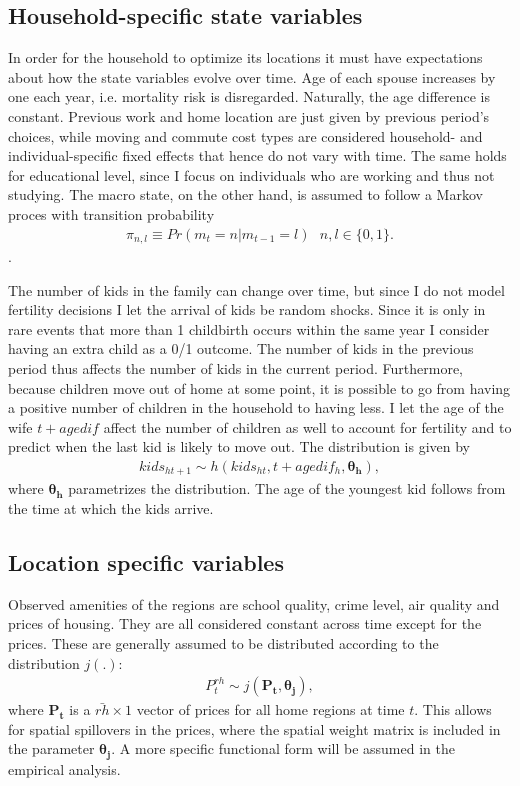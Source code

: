 \subsection{Household-specific state variables}
In order for the household to optimize its locations it must have expectations about how the state variables evolve over time. Age of each spouse increases by one each year, i.e. mortality risk is disregarded. Naturally, the age difference is constant. Previous work and home location are just given by previous period's choices, while moving and commute cost types are considered household- and individual-specific fixed effects that hence do not vary with time. The same holds for educational level, since I focus on individuals who are working and thus not studying. The macro state, on the other hand, is assumed to follow a Markov proces with transition probability 
\begin{align}
\pi_{n,l}\equiv Pr(m_t=n|m_{t-1}=l)\text{ }n,l\in\{0,1\}. \label{eq:macrodens}
\end{align}.

The number of kids in the family can change over time, but since I do not model fertility decisions I let the arrival of kids be random shocks. Since it is only in rare events that more than 1 childbirth occurs within the same year I consider having an extra child as a 0/1 outcome. The number of kids in the previous period thus affects the number of kids in the current period. Furthermore, because children move out of home at some point, it is possible to go from having a positive number of children in the household to having less. I let the age of the wife $t+agedif$ affect the number of children as well to account for fertility and to predict when the last kid is likely to move out. The distribution is given by
\begin{align}
kids_{ht+1} \sim h(kids_{ht},t+agedif_h,\boldsymbol{\theta_h}), \label{eq:kidsdens}
\end{align}
where $\boldsymbol{\theta_h}$ parametrizes the distribution. The age of the youngest kid follows from the time at which the kids arrive. 

\subsection{Location specific variables}
Observed amenities of the regions are school quality, crime level, air quality and prices of housing. They are all considered constant across time except for the prices. These are generally assumed to be distributed according to the distribution $j(.)$:
\begin{align*}
P^{rh}_t \sim j(\boldsymbol{P_{t}},\boldsymbol{\theta_j}),
\end{align*}
where $\boldsymbol{P_{t}}$ is a $\bar{rh}\times 1$ vector of prices for all home regions at time $t$. This allows for spatial spillovers in the prices, where the spatial weight matrix is included in the parameter $\boldsymbol{\theta_j}$. A more specific functional form will be assumed in the empirical analysis.

